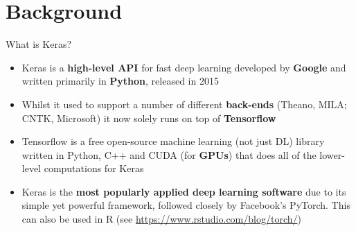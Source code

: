 \documentclass{beamer}
\begin{document}
\section{Background}
\begin{frame}{What is Keras?}
\begin{itemize}
\item Keras is a \textbf{high-level API} for fast deep learning developed by \textbf{Google} and written primarily in \textbf{Python}, released in 2015
\item Whilst it used to support a number of different \textbf{back-ends} (Theano, MILA; CNTK, Microsoft) it now solely runs on top of \textbf{Tensorflow}
\item Tensorflow is a free open-source machine learning (not just DL) library written in Python, C++ and CUDA (for \textbf{GPUs}) that does all of the lower-level computations for Keras
\item Keras is the \textbf{most popularly applied deep learning software} due to its simple yet powerful framework, followed closely by Facebook's PyTorch. This can also be used in R (see \url{https://www.rstudio.com/blog/torch/})
\end{itemize}

\end{frame}
\end{document}
